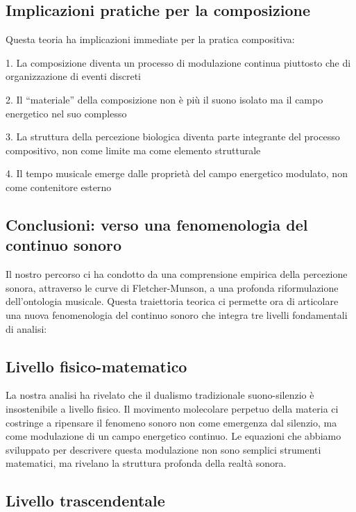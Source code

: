 \documentclass[a4paper,11pt]{article}
\begin{document}
\subsection{Implicazioni pratiche per la
composizione}\label{implicazioni-pratiche-per-la-composizione}

Questa teoria ha implicazioni immediate per la pratica compositiva:

1. La composizione diventa un processo di modulazione continua piuttosto
che di organizzazione di eventi discreti

2. Il ``materiale'' della composizione non è più il suono isolato ma il
campo energetico nel suo complesso

3. La struttura della percezione biologica diventa parte integrante del
processo compositivo, non come limite ma come elemento strutturale

4. Il tempo musicale emerge dalle proprietà del campo energetico
modulato, non come contenitore esterno

\subsection{Conclusioni: verso una fenomenologia del continuo
sonoro}\label{conclusioni-verso-una-fenomenologia-del-continuo-sonoro}

Il nostro percorso ci ha condotto da una comprensione empirica della
percezione sonora, attraverso le curve di Fletcher-Munson, a una
profonda riformulazione dell'ontologia musicale. Questa traiettoria
teorica ci permette ora di articolare una nuova fenomenologia del
continuo sonoro che integra tre livelli fondamentali di analisi:

\subsection{Livello fisico-matematico}\label{livello-fisico-matematico}

La nostra analisi ha rivelato che il dualismo tradizionale
suono-silenzio è insostenibile a livello fisico. Il movimento molecolare
perpetuo della materia ci costringe a ripensare il fenomeno sonoro non
come emergenza dal silenzio, ma come modulazione di un campo energetico
continuo. Le equazioni che abbiamo sviluppato per descrivere questa
modulazione non sono semplici strumenti matematici, ma rivelano la
struttura profonda della realtà sonora.

\subsection{Livello trascendentale}\label{livello-trascendentale}
\end{document}
